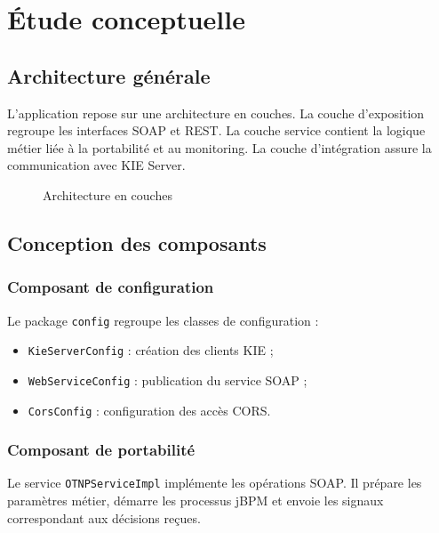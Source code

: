 \documentclass[12pt,a4paper]{report}
\begin{document}
\chapter{Étude conceptuelle}
\section{Architecture générale}
L'application repose sur une architecture en couches. La couche d'exposition regroupe les interfaces SOAP et REST. La couche service contient la logique métier liée à la portabilité et au monitoring. La couche d'intégration assure la communication avec KIE Server.

\begin{figure}[h]
    \centering
    \caption{Architecture en couches}
\end{figure}

\section{Conception des composants}
\subsection{Composant de configuration}
Le package \texttt{config} regroupe les classes de configuration :
\begin{itemize}
    \item \texttt{KieServerConfig} : création des clients KIE ;
    \item \texttt{WebServiceConfig} : publication du service SOAP ;
    \item \texttt{CorsConfig} : configuration des accès CORS.
\end{itemize}

\subsection{Composant de portabilité}
Le service \texttt{OTNPServiceImpl} implémente les opérations SOAP. Il prépare les paramètres métier, démarre les processus jBPM et envoie les signaux correspondant aux décisions reçues.
\end{document}
